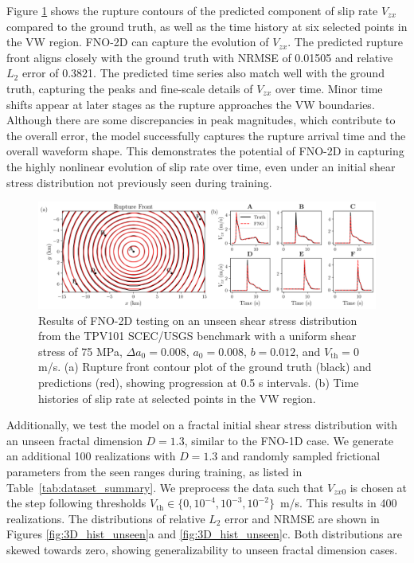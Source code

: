 \documentclass[draft]{agujournal2019}
\begin{document}
Figure \ref{fig:3D_SCEC} shows the rupture contours of the predicted component of slip rate \(V_{zx}\) compared to the ground truth, as well as the time history at six selected points in the VW region. FNO-2D can capture the evolution of \(V_{zx}\). The predicted rupture front aligns closely with the ground truth with NRMSE of 0.01505 and relative \(L_2\) error of 0.3821. The predicted time series also match well with the ground truth, capturing the peaks and fine-scale details of \(V_{zx}\) over time. Minor time shifts appear at later stages as the rupture approaches the VW boundaries. Although there are some discrepancies in peak magnitudes, which contribute to the overall error, the model successfully captures the rupture arrival time and the overall waveform shape. This demonstrates the potential of FNO-2D in capturing the highly nonlinear evolution of slip rate over time, even under an initial shear stress distribution not previously seen during training.

\begin{figure}
\centering
\includegraphics[width=1.0\linewidth]{3D_fractal_unseen_scec.png}
\caption{\label{fig:3D_SCEC}Results of FNO-2D testing on an unseen shear stress distribution from the TPV101 SCEC/USGS benchmark with a uniform shear stress of 75 MPa, \(\Delta a_{0} = 0.008\), \(a_{0} = 0.008\), \(b = 0.012\), and \(V_\text{th}=0\) m/s. (a) Rupture front contour plot of the ground truth (black) and predictions (red), showing progression at 0.5 s intervals. (b) Time histories of slip rate at selected points in the VW region.
}
\end{figure}

Additionally, we test the model on a fractal initial shear stress distribution with an unseen fractal dimension \(D = 1.3\), similar to the FNO-1D case. We generate an additional 100 realizations with \(D = 1.3\) and randomly sampled frictional parameters from the seen ranges during training, as listed in Table~\ref{tab:dataset_summary}. We preprocess the data such that \(V_{zx0}\) is chosen at the step following thresholds \(V_\text{th} \in \{0, 10^{-4}, 10^{-3}, 10^{-2}\}\)~m/s. This results in 400 realizations. The distributions of relative \(L_2\) error and NRMSE are shown in Figures \ref{fig:3D_hist_unseen}a and \ref{fig:3D_hist_unseen}c. Both distributions are skewed towards zero, showing generalizability to unseen fractal dimension cases.
\end{document}
